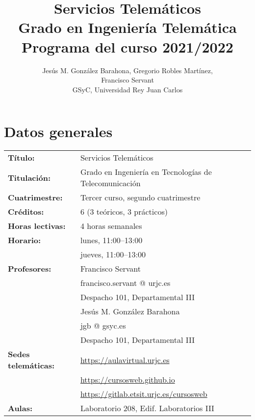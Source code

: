 \documentclass[a4paper,12pt]{article}
\title{Servicios Telemáticos \\
Grado en Ingeniería Telemática \\
Programa del curso 2021/2022}
\author{Jesús M. González Barahona, Gregorio Robles Martínez, \\
  Francisco Servant \\
GSyC, Universidad Rey Juan Carlos}
\begin{document}
\maketitle

\tableofcontents

\newpage

\section{Datos generales}

\begin{tabular}{ll}
\textbf{Título:} & Servicios Telemáticos \\
\textbf{Titulación:} & Grado en Ingeniería en Tecnologías de Telecomunicación \\
\textbf{Cuatrimestre:} & Tercer curso, segundo cuatrimestre \\
\textbf{Créditos:} & 6 (3 teóricos, 3 prácticos) \\
\textbf{Horas lectivas:} & 4 horas semanales \\
\textbf{Horario:} & lunes, 11:00--13:00 \\
                  & jueves, 11:00--13:00 \\
\textbf{Profesores:}
& Francisco Servant \\
& \hspace{1cm}francisco.servant @ urjc.es \\
& \hspace{1cm}Despacho 101, Departamental III\\
& Jesús M. González Barahona \\
& \hspace{1cm}jgb @ gsyc.es \\
& \hspace{1cm}Despacho 101, Departamental III\\
\textbf{Sedes telemáticas:} & \url{https://aulavirtual.urjc.es} \\
                            & \url{https://cursosweb.github.io} \\
                            & \url{https://gitlab.etsit.urjc.es/cursosweb} \\
\textbf{Aulas:} & Laboratorio 208, Edif. Laboratorios III
\end{tabular}
\end{document}
